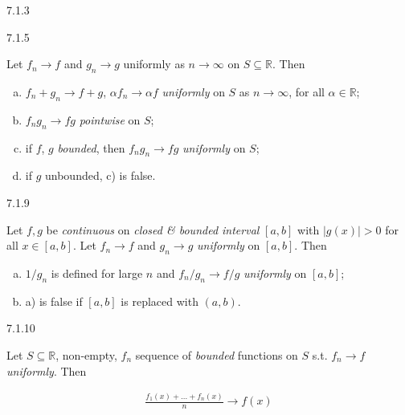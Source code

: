 \documentclass[10pt]{article} %
\begin{document}
\begin{multicols}{3}
\begin{exercise}{7.1.3}{}
\end{exercise}

%
\begin{exercise}{7.1.5}{}

    Let $f_n \to f$ and $g_n \to g$ uniformly as $n \to \infty$ on $S \subseteq \mathbb{R}$. Then

        \begin{enumerate}[a)]
            \setlength{\parskip}{0em}
            \item $f_n + g_n \to f + g$, $\alpha f_n \to \alpha f$ \emph{uniformly} on $S$ as $n \to \infty$, for all $\alpha \in \mathbb{R}$;
            \item $f_ng_n \to fg$ \emph{pointwise} on $S$;
            \item if $f$, $g$ \emph{bounded}, then $f_ng_n \to fg$ \emph{uniformly} on $S$;
            \item if $g$ unbounded, c) is false.
        \end{enumerate}

\end{exercise}

\begin{exercise}{7.1.9}{}

    Let $f,g$ be \emph{continuous} on \emph{closed \& bounded interval} $[a,b]$ with $|g(x)| > 0$ for all $x \in [a,b]$. Let $f_n \to f$ and $g_n \to g$ \emph{uniformly} on $[a,b]$. Then

        \begin{enumerate}[a)]
            \setlength{\parskip}{0em}
            \item $1/g_n$ is defined for large $n$ and $f_n/g_n \to f/g$ \emph{uniformly} on $[a,b]$;
            \item a) is false if $[a,b]$ is replaced with $(a,b)$.
        \end{enumerate}

\end{exercise}

%
\begin{exercise}{7.1.10}{}

    Let $S \subseteq \mathbb{R}$, non-empty, $f_n$ sequence of \emph{bounded} functions on $S$ s.t. $f_n \to f$ \emph{uniformly}. Then

        \begin{align*}
            \frac{f_1(x) + \hdots + f_n(x)}{n} \to f(x)
        \end{align*}


\end{exercise}
\end{multicols}
\end{document}
